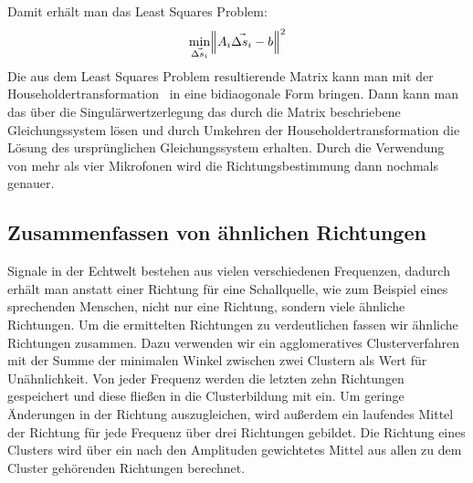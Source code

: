 Damit erhält man das Least Squares Problem:
\begin{equation}
    \min_{\vec{\Delta{s}_i}}{\norm{A_i\vec{\Delta{s}_i} - b}^2}
\end{equation}
Die aus dem Least Squares Problem resultierende Matrix kann man mit der Householdertransformation~\cite{householder2006principles} in eine bidiaogonale Form bringen. Dann kann man das über die Singulärwertzerlegung das durch die Matrix beschriebene Gleichungssystem lösen und durch Umkehren der Householdertransformation die Lösung des ursprünglichen Gleichungssystem erhalten. Durch die Verwendung von mehr als vier Mikrofonen wird die Richtungsbestimmung dann nochmals genauer.
\subsection{Zusammenfassen von ähnlichen Richtungen}
Signale in der Echtwelt bestehen aus vielen verschiedenen Frequenzen, dadurch erhält man anstatt einer Richtung für eine Schallquelle, wie zum Beispiel eines sprechenden Menschen, nicht nur eine Richtung, sondern viele ähnliche Richtungen. Um die ermittelten Richtungen zu verdeutlichen fassen wir ähnliche Richtungen zusammen. Dazu verwenden wir ein agglomeratives Clusterverfahren mit der Summe der minimalen Winkel zwischen zwei Clustern als Wert für Unähnlichkeit. Von jeder Frequenz werden die letzten zehn Richtungen gespeichert und diese fließen in die Clusterbildung mit ein. Um geringe Änderungen in der Richtung auszugleichen, wird außerdem ein laufendes Mittel der Richtung für jede Frequenz über drei Richtungen gebildet. Die Richtung eines Clusters wird über ein nach den Amplituden gewichtetes Mittel aus allen zu dem Cluster gehörenden Richtungen berechnet.

